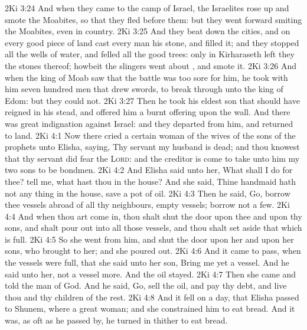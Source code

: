 \vs 2Ki 3:24 And when they came to the camp of Israel, the Israelites rose up and smote the Moabites, so that they fled before them: but they went forward smiting the Moabites, even in  country.
\vs 2Ki 3:25 And they beat down the cities, and on every good piece of land cast every man his stone, and filled it; and they stopped all the wells of water, and felled all the good trees: only in Kirharaseth left they the stones thereof; howbeit the slingers went about , and smote it.
\vs 2Ki 3:26 And when the king of Moab saw that the battle was too sore for him, he took with him seven hundred men that drew swords, to break through  unto the king of Edom: but they could not.
\vs 2Ki 3:27 Then he took his eldest son that should have reigned in his stead, and offered him  a burnt offering upon the wall. And there was great indignation against Israel: and they departed from him, and returned to  land.
\vs 2Ki 4:1 Now there cried a certain woman of the wives of the sons of the prophets unto Elisha, saying, Thy servant my husband is dead; and thou knowest that thy servant did fear the \textsc{Lord}: and the creditor is come to take unto him my two sons to be bondmen.
\vs 2Ki 4:2 And Elisha said unto her, What shall I do for thee? tell me, what hast thou in the house? And she said, Thine handmaid hath not any thing in the house, save a pot of oil.
\vs 2Ki 4:3 Then he said, Go, borrow thee vessels abroad of all thy neighbours,  empty vessels; borrow not a few.
\vs 2Ki 4:4 And when thou art come in, thou shalt shut the door upon thee and upon thy sons, and shalt pour out into all those vessels, and thou shalt set aside that which is full.
\vs 2Ki 4:5 So she went from him, and shut the door upon her and upon her sons, who brought  to her; and she poured out.
\vs 2Ki 4:6 And it came to pass, when the vessels were full, that she said unto her son, Bring me yet a vessel. And he said unto her,  not a vessel more. And the oil stayed.
\vs 2Ki 4:7 Then she came and told the man of God. And he said, Go, sell the oil, and pay thy debt, and live thou and thy children of the rest.
\vs 2Ki 4:8 And it fell on a day, that Elisha passed to Shunem, where  a great woman; and she constrained him to eat bread. And  it was,  as oft as he passed by, he turned in thither to eat bread.

